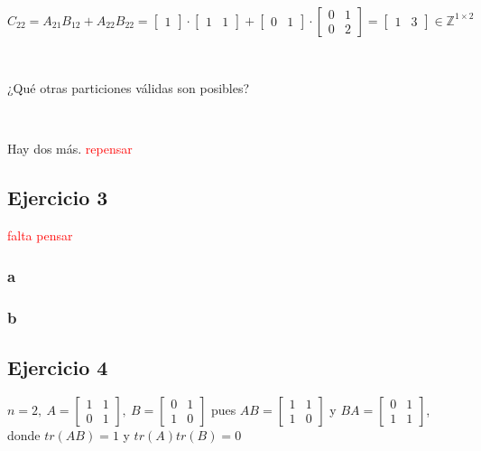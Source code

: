 \documentclass{article}
\begin{document}
\

$C_{22} = A_{21}B_{12} + A_{22}B_{22} =  
\begin{bmatrix}
    1
\end{bmatrix}
\cdot
\begin{bmatrix}
    1 & 1
\end{bmatrix}
+
\begin{bmatrix}
    0 & 1
\end{bmatrix}
\cdot
\begin{bmatrix}
    0 & 1 \\
    0 & 2
\end{bmatrix}
=
\begin{bmatrix}
    1 & 3
\end{bmatrix} \in \mathbb{Z}^{1\times 2}$

\

\noindent ¿Qué otras particiones válidas son posibles?

\

\noindent Hay dos más. \textcolor{red}{repensar}

\subsection*{Ejercicio 3}


\textcolor{red}{falta pensar}

\subsubsection*{a}



\subsubsection*{b}

\subsection*{Ejercicio 4}

$n = 2, ~
A = \begin{bmatrix}
    1 & 1 \\
    0 & 1    
\end{bmatrix}, ~
B = \begin{bmatrix}
    0 & 1 \\
    1 & 0
\end{bmatrix}$ pues 
$AB = \begin{bmatrix}
    1 & 1 \\
    1 & 0
\end{bmatrix}$ y 
$BA = \begin{bmatrix}
    0 & 1 \\
    1 & 1
\end{bmatrix}$, donde $tr(AB) = 1$ y $tr(A)tr(B) = 0$
\end{document}
